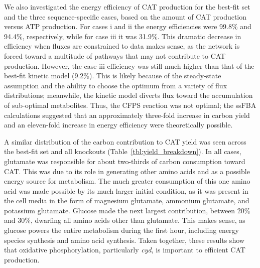 \documentclass[12pt]{article}
\begin{document}
We also investigated the energy efficiency of CAT production for the best-fit set and the three sequence-specific cases, based on the amount of CAT production versus ATP production.
For cases i and ii the energy efficiencies were 99.8\% and 94.4\%, respectively, while for case iii it was 31.9\%.
This dramatic decrease in efficiency when fluxes are constrained to data makes sense, as the network is forced toward a multitude of pathways that may not contribute to CAT production.
However, the case iii efficiency was still much higher than that of the best-fit kinetic model (9.2\%).
This is likely because of the steady-state assumption and the ability to choose the optimum from a variety of flux distributions; meanwhile, the kinetic model diverts flux toward the accumulation of sub-optimal metabolites.
Thus, the CFPS reaction was not optimal; the ssFBA calculations suggested that an approximately three-fold increase in carbon yield and an eleven-fold increase in energy efficiency were theoretically possible.

A similar distribution of the carbon contribution to CAT yield was seen across the best-fit set and all knockouts (Table~\ref{tbl:yield_breakdown}).
In all cases, glutamate was responsible for about two-thirds of carbon consumption toward CAT.
This was due to its role in generating other amino acids and as a possible energy source for metabolism.
The much greater consumption of this one amino acid was made possible by its much larger initial condition, as it was present in the cell media in the form of magnesium glutamate, ammonium glutamate, and potassium glutamate.
Glucose made the next largest contribution, between 20\% and 30\%, dwarfing all amino acids other than glutamate.
This makes sense, as glucose powers the entire metabolism during the first hour, including energy species synthesis and amino acid synthesis.
Taken together, these results show that oxidative phosphorylation, particularly \textit{cyd}, is important to efficient CAT production.
\end{document}
